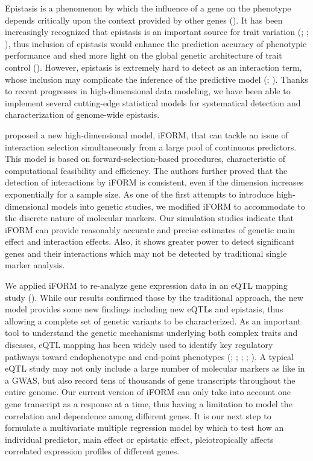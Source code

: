 \documentclass[11pt,]{book}
\theoremstyle{definition}
\theoremstyle{definition}
\theoremstyle{remark}
\begin{document}
Epistasis is a phenomenon by which the influence of a gene on the
phenotype depends critically upon the context provided by other genes
(\cite{cheverud1995epistasis}). It has been increasingly recognized that
epistasis is an important source for trait variation
(\cite{moore2003ubiquitous}; \cite{carlborg2004epistasis};
\cite{cordell2009detecting}), thus inclusion of epistasis would enhance
the prediction accuracy of phenotypic performance and shed more light on
the global genetic architecture of trait control
(\cite{mackay2014epistasis}). However, epistasis is extremely hard to
detect as an interaction term, whose inclusion may complicate the
inference of the predictive model (\cite{carlborg2004epistasis};
\cite{mackay2014epistasis}). Thanks to recent progresses in
high-dimensional data modeling, we have been able to implement several
cutting-edge statistical models for systematical detection and
characterization of genome-wide epistasis.

\cite{hao2014interaction} proposed a new high-dimensional model, iFORM,
that can tackle an issue of interaction selection simultaneously from a
large pool of continuous predictors. This model is based on
forward-selection-based procedures, characteristic of computational
feasibility and efficiency. The authors further proved that the
detection of interactions by iFORM is consistent, even if the dimension
increases exponentially for a sample size. As one of the first attempts
to introduce high-dimensional models into genetic studies, we modified
iFORM to accommodate to the discrete nature of molecular markers. Our
simulation studies indicate that iFORM can provide reasonably accurate
and precise estimates of genetic main effect and interaction effects.
Also, it shows greater power to detect significant genes and their
interactions which may not be detected by traditional single marker
analysis.

We applied iFORM to re-analyze gene expression data in an eQTL mapping
study (\cite{rockman2010selection}). While our results confirmed those
by the traditional approach, the new model provides some new findings
including new eQTLs and epistasis, thus allowing a complete set of
genetic variants to be characterized. As an important tool to understand
the genetic mechanisms underlying both complex traits and diseases, eQTL
mapping has been widely used to identify key regulatory pathways toward
endophenotype and end-point phenotypes (\cite{schadt2005integrative};
\cite{emilsson2008genetics}; \cite{cookson2009mapping};
\cite{pickrell2010understanding}; \cite{nica2013expression}). A typical
eQTL study may not only include a large number of molecular markers as
like in a GWAS, but also record tens of thousands of gene transcripts
throughout the entire genome. Our current version of iFORM can only take
into account one gene transcript as a response at a time, thus having a
limitation to model the correlation and dependence among different
genes. It is our next step to formulate a multivariate multiple
regression model by which to test how an individual predictor, main
effect or epistatic effect, pleiotropically affects correlated
expression profiles of different genes.
\end{document}
